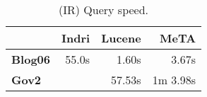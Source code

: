\begin{table}[t]
\centering
{\small
\begin{tabular}{|l|r|r|r|}
    \hline & \textbf{Indri} & \textbf{Lucene} & \textbf{MeTA} \\
    \hline
    \textbf{Blog06} & 55.0s & 1.60s & 3.67s \\
    \textbf{Gov2} & & 57.53s & 1m 3.98s \\
    \hline
\end{tabular}
\caption{(IR) Query speed.}
\label{table:ir-query-speed}
}
\end{table}
